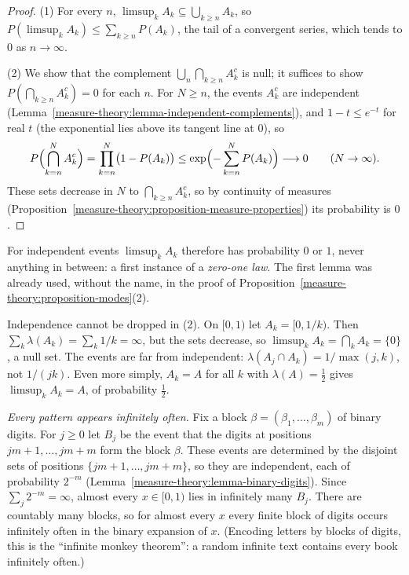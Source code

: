 \begin{proof}
(1) For every $n$, $\limsup_kA_k \subseteq \bigcup_{k \geq n}A_k$, so $P(\limsup_kA_k) \leq \sum_{k \geq n}P(A_k)$, the tail of a convergent series, which tends to $0$ as $n \to \infty$.

(2) We show that the complement $\bigcup_n\bigcap_{k \geq n}A_k^c$ is null; it suffices to show $P(\bigcap_{k \geq n}A_k^c) = 0$ for each $n$. For $N \geq n$, the events $A_k^c$ are independent
(Lemma~\ref{measure-theory:lemma-independent-complements}), and $1 - t \leq e^{-t}$ for real $t$ (the exponential lies above its tangent line at $0$), so
\[
P\Bigl(\bigcap_{k = n}^NA_k^c\Bigr) = \prod_{k = n}^N\bigl(1 - P(A_k)\bigr) \leq \exp\Bigl(-\sum_{k = n}^NP(A_k)\Bigr) \longrightarrow 0 \qquad (N \to \infty).
\]
These sets decrease in $N$ to $\bigcap_{k \geq n}A_k^c$, so by continuity of measures (Proposition~\ref{measure-theory:proposition-measure-properties}) its probability is $0$.
\end{proof}

For independent events $\limsup_kA_k$ therefore has probability $0$ or $1$, never anything in between: a first instance of a \emph{zero-one law}. The first lemma was already used, without the name, in the
proof of Proposition~\ref{measure-theory:proposition-modes}(2).

\begin{counterexample}\label{measure-theory:counterexample-borel-cantelli}
Independence cannot be dropped in (2). On $[0, 1)$ let $A_k = [0, 1/k)$. Then $\sum_k\lambda(A_k) = \sum_k1/k = \infty$, but the sets decrease, so
$\limsup_kA_k = \bigcap_kA_k = \{0\}$, a null set. The events are far from independent: $\lambda(A_j \cap A_k) = 1/\max(j, k)$, not $1/(jk)$. Even more simply, $A_k = A$ for all $k$ with $\lambda(A) = \frac12$ gives
$\limsup_kA_k = A$, of probability $\frac12$.
\end{counterexample}

\begin{example}\label{measure-theory:example-infinite-monkey}
\emph{Every pattern appears infinitely often.} Fix a block $\beta = (\beta_1, \ldots, \beta_m)$ of binary digits. For $j \geq 0$ let $B_j$ be the event that the digits at positions
$jm + 1, \ldots, jm + m$ form the block $\beta$. These events are determined by the disjoint sets of positions $\{jm + 1, \ldots, jm + m\}$, so they are independent, each of probability $2^{-m}$
(Lemma~\ref{measure-theory:lemma-binary-digits}). Since $\sum_j2^{-m} = \infty$, almost every $x \in [0, 1)$ lies in infinitely many $B_j$. There are countably many blocks, so for almost every $x$ every
finite block of digits occurs infinitely often in the binary expansion of $x$. (Encoding letters by blocks of digits, this is the ``infinite monkey theorem'': a random infinite text contains every
book infinitely often.)
\end{example}

